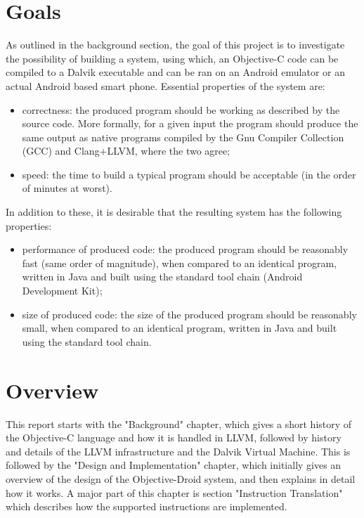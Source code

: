 \documentclass[parskip]{cs4rep}
\begin{document}
\section{Goals} \label{sec:goals}

As outlined in the background section, the goal of this project is to investigate the possibility of building a system, using which, an Objective-C code can be compiled to a Dalvik executable and can be ran on an Android emulator or an actual Android based smart phone. Essential properties of the system are:
\begin{itemize}
\item
correctness: the produced program should be working as described by the source code. More formally, for a given input the program should produce the same output as native programs compiled by the Gnu Compiler Collection (GCC) and Clang+LLVM, where the two agree;
\item
speed: the time to build a typical program should be acceptable (in the order of minutes at worst).
\end{itemize}

In addition to these, it is desirable that the resulting system has the following properties:

\begin{itemize}
\item
performance of produced code: the produced program should be reasonably fast (same order of magnitude), when compared to an identical program, written in Java and built using the standard tool chain (Android Development Kit);
\item
size of produced code: the size of the produced program should be reasonably small, when compared to an identical program, written in Java and built using the standard tool chain.
\end{itemize}

\section{Overview}

This report starts with the "Background" chapter, which gives a short history of the Objective-C language and how it is handled in LLVM, followed by history and details of the LLVM infrastructure and the Dalvik Virtual Machine. This is followed by the "Design and Implementation" chapter, which initially gives an overview of the design of the Objective-Droid system, and then explains in detail how it works. A major part of this chapter is section "Instruction Translation" which describes how the supported instructions are implemented. 
\end{document}
